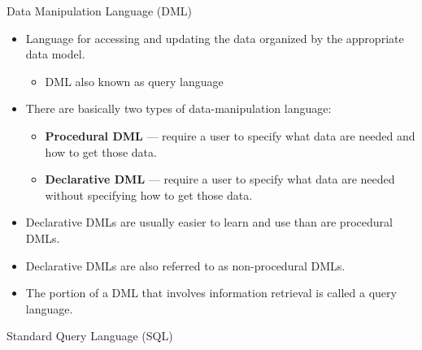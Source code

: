 \documentclass{beamer}
\begin{document}
\begin{frame}{Data Manipulation Language (DML)}
    \begin{itemize}
        \item Language for accessing and updating the data organized by the appropriate data model.
        \begin{itemize}
            \item DML also known as query language
        \end{itemize}
        \item There are basically two types of data-manipulation language:
        \begin{itemize}
            \item \textbf{Procedural DML} --- require a user to specify what data are needed and how to get those data.
            \item \textbf{Declarative DML} --- require a user to specify what data are needed without specifying how to get those data. 
        \end{itemize}
        \item Declarative DMLs are usually easier to learn and use than are procedural DMLs.  
        \item Declarative DMLs are also referred to as non-procedural DMLs.
        \item The portion of a DML that involves information retrieval is called a query language.  
    \end{itemize}
\end{frame}

\begin{frame}[fragile]{Standard Query Language (SQL)}
\end{frame}

\end{document}
